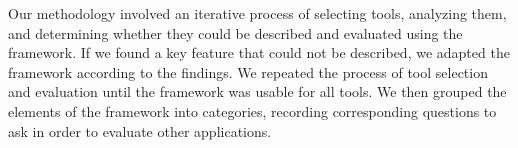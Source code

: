\documentclass[review]{elsarticle}
\begin{document}
{Our methodology involved an iterative process of selecting tools, analyzing them, and determining whether they could be described and evaluated using the framework. If we found a key feature that could not be described, we adapted the framework according to the findings. We repeated the process of tool selection and evaluation until the framework was usable for all tools. We then grouped the elements of the framework into categories, recording corresponding questions to ask in order to evaluate other applications. 
%

\begin{table}[htbp]
\small
\begin{tabular}{|p{}| p{}| p{}|}


\end{tabular}
\end{table}}
\end{document}
